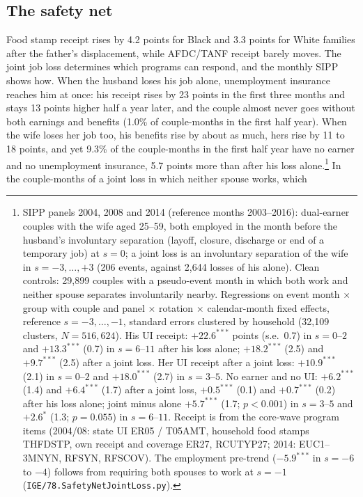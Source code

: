 
\subsection{The safety net}

Food stamp receipt rises by 4.2 points for Black and 3.3 points for White families after the father's displacement,
while AFDC/TANF receipt barely moves. The joint job loss determines which programs can respond, and the monthly SIPP
shows how. When the husband loses his job alone, unemployment insurance reaches him at once: his receipt rises by 23
points in the first three months and stays 13 points higher half a year later, and the couple almost never goes
without both earnings and benefits (1.0\% of couple-months in the first half year). When the wife loses her job too,
his benefits rise by about as much, hers rise by 11 to 18 points, and yet 9.3\% of the couple-months in the first half
year have no earner and no unemployment insurance, 5.7 points more than after his loss alone.\footnote{SIPP panels
2004, 2008 and 2014 (reference months 2003--2016): dual-earner couples with the wife aged 25--59, both employed in
the month before the husband's involuntary separation (layoff, closure, discharge or end of a temporary job) at
$s = 0$; a joint loss is an involuntary separation of the wife in $s = -3, \dots, +3$ (206 events, against 2{,}644
losses of his alone). Clean controls: 29{,}899 couples with a pseudo-event month in which both work and neither
spouse separates involuntarily nearby. Regressions on event month $\times$ group with couple and panel $\times$
rotation $\times$ calendar-month fixed effects, reference $s = -3, \dots, -1$, standard errors clustered by household
(32{,}109 clusters, $N = 516{,}624$). His UI receipt: $+22.6^{***}$ points (s.e.\ 0.7) in $s = 0$--$2$ and
$+13.3^{***}$ (0.7) in $s = 6$--$11$ after his loss alone; $+18.2^{***}$ (2.5) and $+9.7^{***}$ (2.5) after a joint
loss. Her UI receipt after a joint loss: $+10.9^{***}$ (2.1) in $s = 0$--$2$ and $+18.0^{***}$ (2.7) in $s = 3$--$5$.
No earner and no UI: $+6.2^{***}$ (1.4) and $+6.4^{***}$ (1.7) after a joint loss, $+0.5^{***}$ (0.1) and
$+0.7^{***}$ (0.2) after his loss alone; joint minus alone $+5.7^{***}$ (1.7; $p<0.001$) in $s = 3$--$5$ and
$+2.6^{*}$ (1.3; $p=0.055$) in $s = 6$--$11$. Receipt is from the core-wave program items (2004/08: state UI ER05 /
T05AMT, household food stamps THFDSTP, own receipt and coverage ER27, RCUTYP27; 2014: EUC1--3MNYN, RFSYN, RFSCOV).
The employment pre-trend ($-5.9^{***}$ in $s = -6$ to $-4$) follows from requiring both spouses to work at $s = -1$
(\texttt{IGE/78.SafetyNetJointLoss.py}).} In the couple-months of a joint loss in which neither spouse works, which
